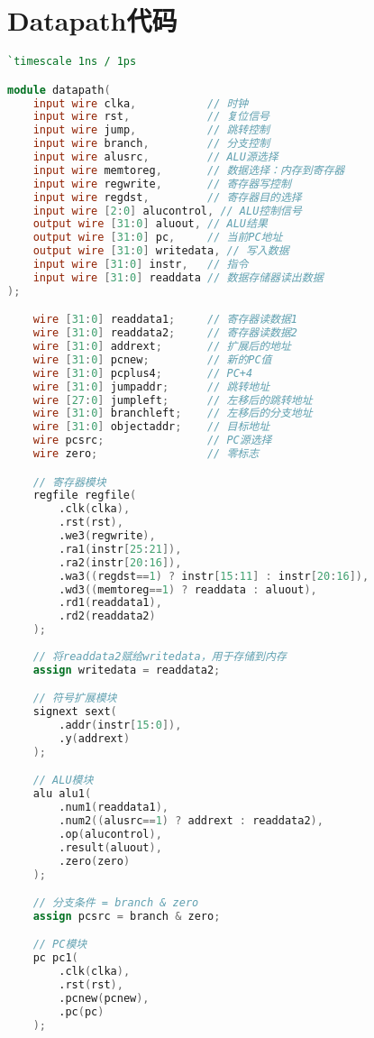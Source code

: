 \appendix
\newpage
\section{Datapath代码}
\begin{lstlisting}[language=Verilog]
`timescale 1ns / 1ps

module datapath(
    input wire clka,           // 时钟
    input wire rst,            // 复位信号
    input wire jump,           // 跳转控制
    input wire branch,         // 分支控制
    input wire alusrc,         // ALU源选择
    input wire memtoreg,       // 数据选择：内存到寄存器
    input wire regwrite,       // 寄存器写控制
    input wire regdst,         // 寄存器目的选择
    input wire [2:0] alucontrol, // ALU控制信号
    output wire [31:0] aluout, // ALU结果
    output wire [31:0] pc,     // 当前PC地址
    output wire [31:0] writedata, // 写入数据
    input wire [31:0] instr,   // 指令
    input wire [31:0] readdata // 数据存储器读出数据
);

    wire [31:0] readdata1;     // 寄存器读数据1
    wire [31:0] readdata2;     // 寄存器读数据2
    wire [31:0] addrext;       // 扩展后的地址
    wire [31:0] pcnew;         // 新的PC值
    wire [31:0] pcplus4;       // PC+4
    wire [31:0] jumpaddr;      // 跳转地址
    wire [27:0] jumpleft;      // 左移后的跳转地址
    wire [31:0] branchleft;    // 左移后的分支地址
    wire [31:0] objectaddr;    // 目标地址
    wire pcsrc;                // PC源选择
    wire zero;                 // 零标志

    // 寄存器模块
    regfile regfile(
        .clk(clka),
        .rst(rst),
        .we3(regwrite),
        .ra1(instr[25:21]),
        .ra2(instr[20:16]),
        .wa3((regdst==1) ? instr[15:11] : instr[20:16]),
        .wd3((memtoreg==1) ? readdata : aluout),
        .rd1(readdata1),
        .rd2(readdata2)
    );
    
    // 将readdata2赋给writedata，用于存储到内存
    assign writedata = readdata2;

    // 符号扩展模块
    signext sext(
        .addr(instr[15:0]),
        .y(addrext)
    );

    // ALU模块
    alu alu1(
        .num1(readdata1),
        .num2((alusrc==1) ? addrext : readdata2),
        .op(alucontrol),
        .result(aluout),
        .zero(zero)
    );

    // 分支条件 = branch & zero
    assign pcsrc = branch & zero;

    // PC模块
    pc pc1(
        .clk(clka),
        .rst(rst),
        .pcnew(pcnew),
        .pc(pc)
    );


\end{lstlisting}
